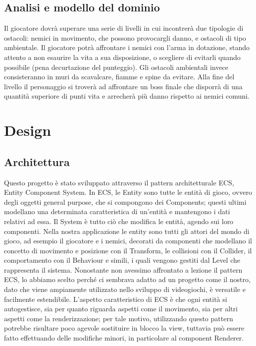 \documentclass{article}
\begin{document}
\subsection{Analisi e modello del dominio}
Il giocatore dovrà superare una serie di livelli in cui incontrerà due tipologie di ostacoli: nemici in movimento, che possono provocargli danno, e ostacoli di tipo ambientale.
Il giocatore potrà affrontare i nemici con l'arma in dotazione, stando attento a non esaurire la vita a sua disposizione, o scegliere di evitarli quando possibile (pena decurtazione del punteggio).
Gli ostacoli ambientali invece consisteranno in muri da scavalcare, fiamme e spine da evitare.
Alla fine del livello il personaggio si troverà ad affrontare un boss finale che disporrà di una quantità superiore di punti vita e arrecherà più danno rispetto ai nemici comuni.


\section{Design}
\subsection{Architettura}
Questo progetto è stato sviluppato attraverso il pattern architetturale ECS, Entity Component System.
In ECS, le Entity sono tutte le entità di gioco, ovvero degli oggetti general purpose, che si compongono dei Components; questi ultimi modellano una determinata caratteristica di un'entità e mantengono i dati relativi ad essa. Il System è tutto ciò che modifica le entità, agendo sui loro componenti. Nella nostra applicazione le entity sono tutti gli attori del mondo di gioco, ad esempio il giocatore e i nemici, decorati da componenti che modellano il concetto di movimento e posizione con il Transform, le collisioni con il Collider, il comportamento con il Behaviour e simili, i quali vengono gestiti dal Level che rappresenta il sistema.
Nonostante non avessimo affrontato a lezione il pattern ECS, lo abbiamo scelto perché ci sembrava adatto ad un progetto come il nostro, dato che viene ampiamente utilizzato nello sviluppo di videogiochi, è versatile e facilmente estendibile.
L'aspetto caratteristico di ECS è che ogni entità si autogestisce, sia per quanto riguarda aspetti come il movimento, sia per altri aspetti come la renderizzazione; per tale motivo, utilizzando questo pattern potrebbe risultare poco agevole sostituire in blocco la view, tuttavia può essere fatto effettuando delle modifiche minori, in particolare al component Renderer.
\end{document}
